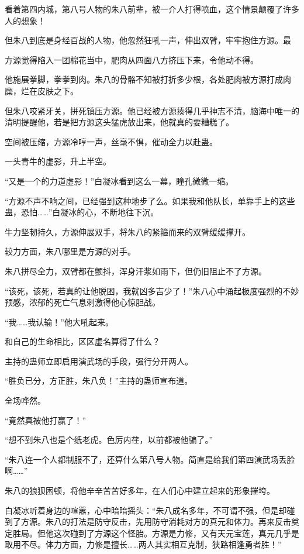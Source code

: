 
\begin{this_body}

看着第四内城，第八号人物的朱八前辈，被一介人打得喷血，这个情景颠覆了许多人的想象！

但朱八到底是身经百战的人物，他忽然狂吼一声，伸出双臂，牢牢抱住方源。最

方源觉得陷入一团棉花当中，肥肉从四面八方挤压下来，令他动不得。

他施展拳脚，拳拳到肉。朱八的骨骼不知被打折多少根，各处肥肉被方源打成肉糜，烂在皮肤之下。

但朱八咬紧牙关，拼死镇压方源。他已经被方源揍得几乎神志不清，脑海中唯一的清明提醒他，若是把方源这头猛虎放出来，他就真的要糟糕了。

空间被压缩，方源冷哼一声，丝毫不惧，催动全力以赴蛊。

一头青牛的虚影，升上半空。

“又是一个的力道虚影！”白凝冰看到这么一幕，瞳孔微微一缩。

“方源不声不响之间，已经强到这种地步了么。如果我和他队长，单靠手上的这些蛊，恐怕……”白凝冰的心，不断地往下沉。

牛力坚韧持久，方源伸展双手，将朱八的紧箍而来的双臂缓缓撑开。

较力方面，朱八哪里是方源的对手。

朱八拼尽全力，双臂都在颤抖，浑身汗浆如雨下，但仍旧阻止不了方源。

“该死，该死，若真的让他脱困，我就凶多吉少了！”朱八心中涌起极度强烈的不妙预感，浓郁的死亡气息刺激得他心惊胆战。

“我……我认输！”他大吼起来。

和自己的生命相比，区区虚名算得了什么？

主持的蛊师立即启用演武场的手段，强行分开两人。

“胜负已分，方正胜，朱八负！”主持的蛊师宣布道。

全场哗然。

“竟然真被他打赢了！”

“想不到朱八也是个纸老虎。色厉内荏，以前都被他骗了。”

“朱八连一个人都制服不了，还算什么第八号人物。简直是给我们第四演武场丢脸啊……”

朱八的狼狈困顿，将他辛辛苦苦好多年，在人们心中建立起来的形象摧垮。

白凝冰听着身边的喧嚣，心中暗暗摇头：“朱八成名多年，不可谓不强，但是却碰到了方源。朱八的打法是防守反击，先用防守消耗对方的真元和体力。再来反击奠定胜局。但他这次碰到了方源这个怪胎。方源是力修，又有天元宝莲，真元几乎是取用不尽。体力方面，力修是擅长……两人其实相互克制，狭路相逢勇者胜！”


\end{this_body}
